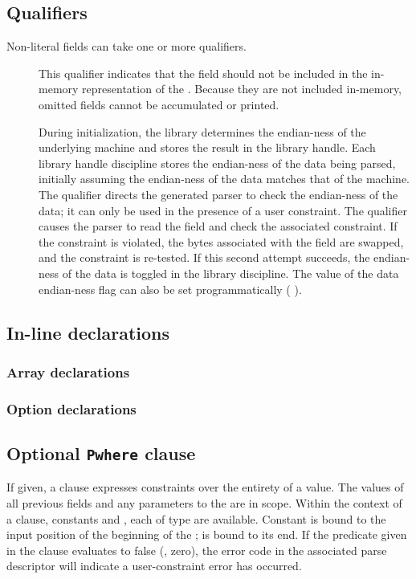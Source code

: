 \subsection{Qualifiers}
\label{sec:structs-qualifiers}
Non-literal fields can take one or more qualifiers.
\begin{description}
\item[\Pomit{}] This qualifier indicates that the field
  should not be included in the in-memory representation of the
  \Pstruct{}.  Because they are not included in-memory, omitted fields
  cannot be accumulated or printed.
\item[\Pendian{}] During initialization, the \PADS{} library
  determines the endian-ness of the underlying machine and stores the
  result in the library handle.  Each library handle discipline stores
  the endian-ness of the data being parsed, initially assuming the
  endian-ness of the data matches that of the machine.  The \Pendian{}
  qualifier directs the generated parser to check the endian-ness of
  the data; it can only be used in the presence of a user constraint.
  The qualifier causes the parser to read the field and check the
  associated constraint.  If the constraint is violated, the bytes
  associated with the field are swapped, and the constraint is
  re-tested.  If this second attempt succeeds, the endian-ness of the
  data is toggled in the library discipline.  The value of the data
  endian-ness flag can also be set programmatically (\cf
  ).
\end{description}

\subsection{In-line declarations}
\label{sec:structs-inline}
\subsubsection{Array declarations}
\label{sec:arrays-inline}
\subsubsection{Option declarations}
\label{sec:options-inline}

\subsection{Optional \texttt{Pwhere} clause}
If given, a \Pwhere{} clause expresses constraints over the entirety
of a \Pstruct{} value.  The values of all previous fields and any
parameters to the \Pstruct{} are in scope.  Within the context of a 
\Pparsecheck{} clause, constants  and , each of type 
\PDCpost{} are available.  Constant  is bound to the input
position of the beginning of the \pstruct{};  is bound to its end.
If the predicate given in
the \Pwhere{} clause evaluates to false (\ie{}, zero), the error code
in the associated parse descriptor will indicate a user-constraint
error has occurred.  

